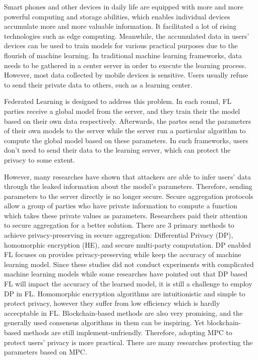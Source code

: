 Smart phones and other devices in daily life are equipped with more and more powerful computing and storage abilities, which enables individual devices accumulate more and more valuable information. It facilitated a lot of rising technologies such as edge computing. Meanwhile, the accumulated data in users' devices can be used to train models for various practical purposes due to the flourish of machine learning. In traditional machine learning frameworks, data needs to be gathered in a center server in order to execute the learning process. However, most data collected by mobile devices is sensitive. Users usually refuse to send their private data to others, such as a learning center. 

Federated Learning\cite{mcmahan2016communicationefficient} is designed to address this problem. In each round, FL parties receive a global model from the server, and they train their the model based on their own data respectively. Afterwards, the partes send the parameters of their own models to the server while the server run a particular algorithm to compute the global model based on these parameters. In such frameworks, users don't need to send their data to the learning server, which can protect the privacy to some extent.

However, many researches have shown that attackers are able to infer users' data through the leaked information about the model's parameters\cite{Beyond, Leakage}. Therefore, sending parameters to the server directly is no longer secure. Secure aggregation protocols allow a group of parties who have private information to compute a function which takes these private values as parameters. Researchers paid their attention to secure aggregation for a better solution\cite{shi2011privacy,RobustAgg,Bonawitz19,Nike,PrivFL}. There are 3 primary methods to achieve privacy-preserving in secure aggregation: Differential Privacy (DP), homomorphic encryption (HE), and secure multi-party computation. DP enabled FL\cite{Bayesian,DPAnalysis,ZhuDP,geyer2017differentially,Hybrid} focuses on provides privacy-preserving while keep the accuracy of machine learning model. Since these studies did not conduct experiments with complicated machine learning models while some researches have pointed out that DP based FL will impact the accuracy of the learned model\cite{Two-Phase}, it is still a challenge to employ DP in FL. Homomorphic encryption algorithms are intuitionistic and simple to protect privacy, however they suffer from low efficiency which is hardly accecptable in FL. Blockchain-based methods\cite{DeepChain,Lu2020,On-Device} are also very promising, and the generally used consensus algorithms in them can be inspiring. Yet blockchain-based methods are still implement-unfriendly. Therefore, adopting MPC to protect users' privacy is more practical. There are many researches protecting the parameters based on MPC\cite{Practical,Two-Phase,Weighted,Hybrid}. 

